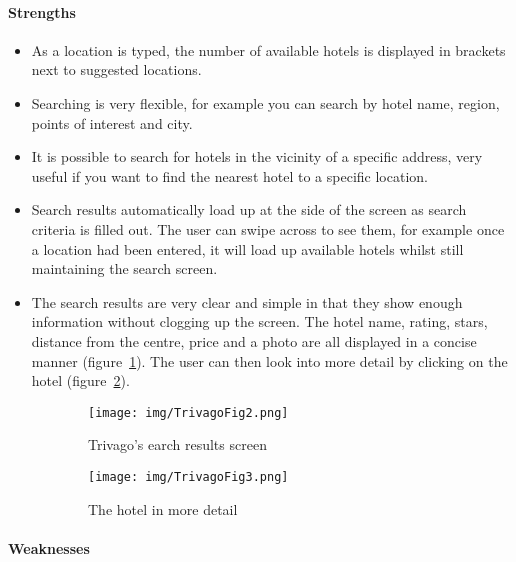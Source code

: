 
\paragraph{Strengths}
\begin{itemize}
	\item As a location is typed, the number of available hotels is displayed
		in brackets next to suggested locations.
	\item Searching is very flexible, for example you can search by hotel name,
		region, points of interest and city.
	\item It is possible to search for hotels in the vicinity of a specific
		address, very useful if you want to find the nearest hotel to a
		specific location.
	\item Search results automatically load up at the side of the screen as
		search criteria is filled out. The user can swipe across to see them,
		for example once a location had been entered, it will load up available
		hotels whilst still maintaining the search screen.
	\item The search results are very clear and simple in that they show enough
		information without clogging up the screen. The hotel name, rating,
		stars, distance from the centre, price and a photo are all displayed in
		a concise manner (figure~\ref{fig:TrivagoFig2}). The user can then look
		into more detail by clicking on the hotel
		(figure~\ref{fig:TrivagoFig3}).
\end{itemize}
\begin{figure}[ht]
	\centering
	\begin{subfigure}[b]{0.2\textwidth}
		\texttt{[image: img/TrivagoFig2.png]}
		\caption{Trivago's earch results screen}\label{fig:TrivagoFig2}
	\end{subfigure}%
	\qquad
	\begin{subfigure}[b]{0.2\textwidth}
		\texttt{[image: img/TrivagoFig3.png]}
		\caption{The hotel in more detail}\label{fig:TrivagoFig3}
	\end{subfigure}
	\caption{}\label{fig:trivago2}
\end{figure}

\paragraph{Weaknesses}

